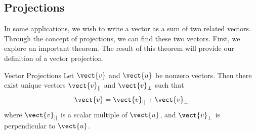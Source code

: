 \subsection{Projections}

In some applications, we wish to write a vector as a sum of two related vectors. Through the concept of projections, we can find these two vectors. First, we explore an important theorem. The result of 
this theorem will provide our definition of a vector projection.

\begin{theorem}{Vector Projections}\label{thm:projection}
Let $\vect{v}$ and $\vect{u}$ be nonzero vectors. Then
there exist unique vectors $\vect{v}_{||}$ and $\vect{v}_{\bot }$ such
that
\begin{equation}
\vect{v}=\vect{v}_{||}+\vect{v}_{\bot }  \label{projection}
\end{equation}
where $\vect{v}_{||}$ is a scalar multiple of $\vect{u}$, 
and $\vect{v}_{\bot}$ is perpendicular to $\vect{u}$.

\end{theorem}

